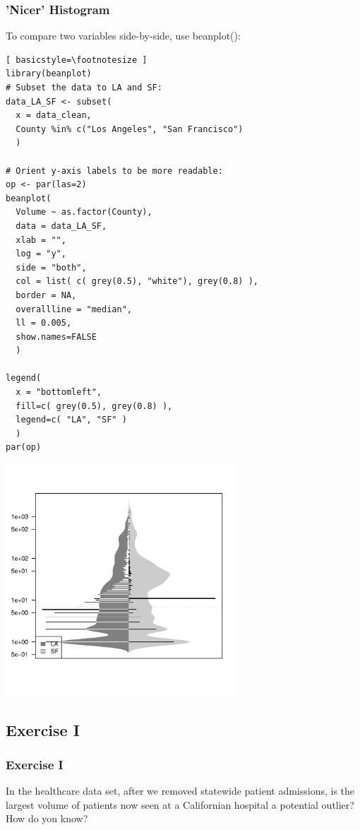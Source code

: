 \begin{frame}
	\frametitle{'Nicer' Histogram}

To compare two variables side-by-side, use \ttfamily beanplot(): \normalfont

	\begin{lstlisting}[ basicstyle=\footnotesize ]
library(beanplot)
# Subset the data to LA and SF:
data_LA_SF <- subset(
  x = data_clean, 
  County %in% c("Los Angeles", "San Francisco") 
  )

# Orient y-axis labels to be more readable:
op <- par(las=2)
beanplot(
  Volume ~ as.factor(County), 
  data = data_LA_SF, 
  xlab = "",
  log = "y",
  side = "both", 
  col = list( c( grey(0.5), "white"), grey(0.8) ), 
  border = NA, 
  overallline = "median", 
  ll = 0.005,
  show.names=FALSE
  )

legend(
  x = "bottomleft",
  fill=c( grey(0.5), grey(0.8) ), 
  legend=c( "LA", "SF" )
  )
par(op)
	\end{lstlisting}

\newpage
        \begin{center}
	         \includegraphics[width=0.65\textwidth]{images/beanplot.pdf}
        \end{center}

\end{frame}



\subsection{Exercise I}
\begin{frame}
	\frametitle{Exercise I}
	In the healthcare data set, after we removed statewide patient admissions, is the largest volume of patients now seen at a Californian hospital a potential outlier?  How do you know?
\end{frame}